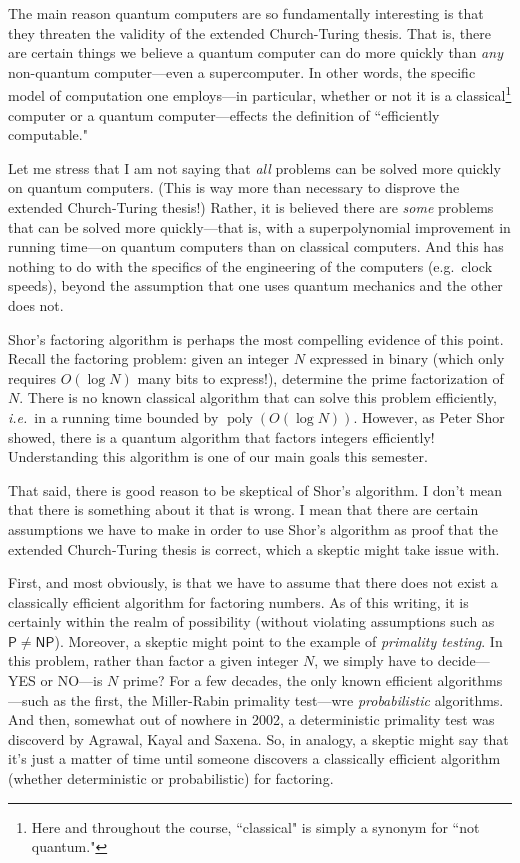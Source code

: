 \documentclass{article}
\DeclareMathOperator{\poly}{poly}
\begin{document}
The main reason quantum computers are so fundamentally interesting is that they threaten the validity of the extended Church-Turing thesis.  That is, there are certain things we believe a quantum computer can do more quickly than \emph{any} non-quantum computer---even a supercomputer.  In other words, the specific model of computation one employs---in particular, whether or not it is a classical\footnote{Here and throughout the course, ``classical" is simply a synonym for ``not quantum."} computer or a quantum computer---effects the definition of ``efficiently computable."

Let me stress that I am not saying that \emph{all} problems can be solved more quickly on quantum computers.  (This is way more than necessary to disprove the extended Church-Turing thesis!)  Rather, it is believed there are \emph{some} problems that can be solved more quickly---that is, with a superpolynomial improvement in running time---on quantum computers than on classical computers.  And this has nothing to do with the specifics of the engineering of the computers (e.g.\ clock speeds), beyond the assumption that one uses quantum mechanics and the other does not.

Shor's factoring algorithm is perhaps the most compelling evidence of this point.  Recall the factoring problem: given an integer $N$ expressed in binary (which only requires $O(\log N)$ many bits to express!), determine the prime factorization of $N$.  There is no known classical algorithm that can solve this problem efficiently, \emph{i.e.}\ in a running time bounded by $\poly(O(\log N))$.  However, as Peter Shor showed, there is a quantum algorithm that factors integers efficiently!  Understanding this algorithm is one of our main goals this semester.

That said, there is good reason to be skeptical of Shor's algorithm.  I don't mean that there is something about it that is wrong.  I mean that there are certain assumptions we have to make in order to use Shor's algorithm as proof that the extended Church-Turing thesis is correct, which a skeptic might take issue with.

First, and most obviously, is that we have to assume that there does not exist a classically efficient algorithm for factoring numbers.  As of this writing, it is certainly within the realm of possibility (without violating assumptions such as $\mathsf{P} \ne \mathsf{NP}$).  Moreover, a skeptic might point to the example of \emph{primality testing}.  In this problem, rather than factor a given integer $N$, we simply have to decide---YES or NO---is $N$ prime?  For a few decades, the only known efficient algorithms---such as the first, the Miller-Rabin primality test---wre \emph{probabilistic} algorithms.  And then, somewhat out of nowhere in 2002, a deterministic primality test was discoverd by Agrawal, Kayal and Saxena.  So, in analogy, a skeptic might say that it's just a matter of time until someone discovers a classically efficient algorithm (whether deterministic or probabilistic) for factoring.
\end{document}
